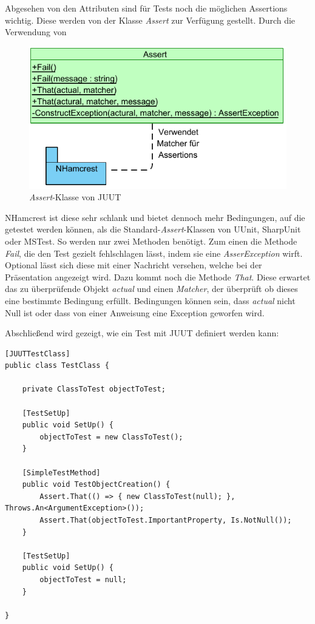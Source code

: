 Abgesehen von den Attributen sind für Tests noch die möglichen Assertions wichtig. Diese werden von der Klasse \textit{Assert} zur Verfügung gestellt. Durch die Verwendung von
\begin{figure}
\centering
\includegraphics[width=0.95\linewidth]{images/Kapitel_Ergebnis/Assert}
\caption[\textit{Assert}-Klasse von JUUT]{\textit{Assert}-Klasse von JUUT}
\label{fig:Assert}
\end{figure}
NHamcrest ist diese sehr schlank und bietet dennoch mehr Bedingungen, auf die getestet werden können, als die Standard-\textit{Assert}-Klassen von UUnit, SharpUnit oder MSTest. So werden nur zwei Methoden benötigt. Zum einen die Methode \textit{Fail}, die den Test gezielt fehlschlagen lässt, indem sie eine \textit{AsserException} wirft. Optional lässt sich diese mit einer Nachricht versehen, welche bei der Präsentation angezeigt wird. Dazu kommt noch die Methode \textit{That}. Diese erwartet das zu überprüfende Objekt \textit{actual} und einen \textit{Matcher}, der überprüft ob dieses eine bestimmte Bedingung erfüllt. Bedingungen können sein, dass \textit{actual} nicht Null ist oder dass von einer Anweisung eine Exception geworfen wird.

Abschließend wird gezeigt, wie ein Test mit JUUT definiert werden kann:
\begin{lstlisting}[caption={[Beispiel für einen Test mit JUUT]Beispiel für einen Test mit JUUT\\In diesem Fall sind \textit{Throws.An} und \textit{Is.NotNull} die Matcher, welche den ersten Parameter darauf überprüfen, dass eine Exception geworfen wird beziehungsweise das Objekt nicht Null ist.}, label=code:SimpleTestMethodAttribute_Validate]
[JUUTTestClass]
public class TestClass {
	
	private ClassToTest objectToTest;
	
	[TestSetUp]
	public void SetUp() {
		objectToTest = new ClassToTest();
	}
	
	[SimpleTestMethod]
	public void TestObjectCreation() {
		Assert.That(() => { new ClassToTest(null); }, Throws.An<ArgumentException>());
		Assert.That(objectToTest.ImportantProperty, Is.NotNull());
	}
		
	[TestSetUp]
	public void SetUp() {
		objectToTest = null;
	}
	
}
\end{lstlisting}
\clearpage

